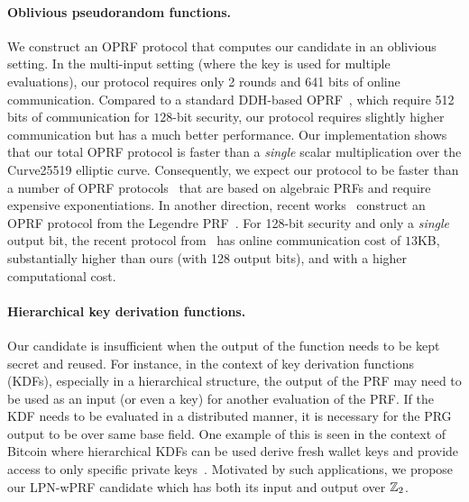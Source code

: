 \paragraph{Oblivious pseudorandom functions.} 
We construct an OPRF protocol that computes our \ttwPRF candidate in an oblivious setting. In the multi-input setting (where the key is used for multiple evaluations), our protocol requires only 2 rounds and 641 bits of online communication.
Compared to a standard DDH-based OPRF~\cite{jarecki2014-ddhoprf,jarecki2016-ddhoprf}, which require 512 bits of communication for $128$-bit security, our protocol requires slightly higher communication but has a much better performance. Our implementation shows that our total OPRF protocol is faster than a \textit{single} scalar multiplication over the Curve25519 elliptic curve. Consequently, we expect our protocol to be faster than a number of OPRF protocols~\cite{freedman2005-oprf,jarecki2009-oprf} that are based on algebraic PRFs and require expensive exponentiations. In another direction, recent works~\cite{grassi2016-mpcfriendly,seres2021-legendre} construct an OPRF protocol from the Legendre PRF~\cite{damgard1988-legendre}. For 128-bit security and only a {\em single} output bit, the recent protocol from~\cite{seres2021-legendre} has online communication cost of $13$KB, substantially higher than ours (with 128 output bits), and with a higher computational cost.


\paragraph{Hierarchical key derivation functions.} 
Our \ttwPRF candidate is insufficient when the output of the function needs to be kept secret and reused. For instance, in the context of key derivation functions (KDFs), especially in a hierarchical structure, the output of the PRF may need to be used as an input (or even a key) for another evaluation of the PRF. If the KDF needs to be evaluated in a distributed manner, it is necessary for the PRG output to be over same base field. One example of this is seen in the context of Bitcoin where hierarchical KDFs can be used derive fresh wallet keys and provide access to only specific private keys~\cite{bitcoin_bip0032}. Motivated by such applications, we propose our LPN-wPRF candidate which has both its input and output over $\mathbb{Z}_2$.



